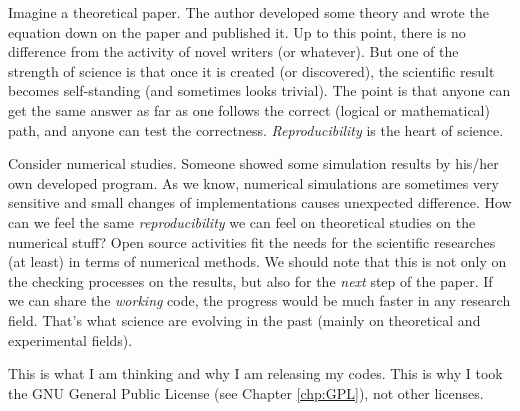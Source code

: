 \documentclass{book}
\begin{document}
Imagine a theoretical paper. The author developed some 
theory and wrote the equation down on the paper and published it.
Up to this point, there is no difference from
the activity of novel writers (or whatever).
But one of the strength of science is that
once it is created (or discovered),
the scientific result becomes self-standing
(and sometimes looks trivial).
The point is that anyone can get the same answer
as far as one follows the correct (logical or mathematical)
path, and anyone can test the correctness.
{\it Reproducibility} is the heart of science.


Consider numerical studies.
Someone showed some simulation results by his/her own
developed program. As we know, numerical simulations
are sometimes very sensitive and small changes of 
implementations causes unexpected difference.
How can we feel the same {\it reproducibility}
we can feel on theoretical studies on the numerical stuff?
%
Open source activities fit the needs for the scientific
researches (at least) in terms of numerical methods.
%
We should note that this is not only on the checking processes
on the results, but also for the {\it next} step of the paper.
If we can share the {\it working} code, the progress would
be much faster in any research field. That's what science 
are evolving in the past (mainly on theoretical and 
experimental fields).


This is what I am thinking and why I am releasing my codes.
This is why I took the GNU General Public License
(see Chapter \ref{chp:GPL}), not other licenses.


\newpage

\appendix
\end{document}
